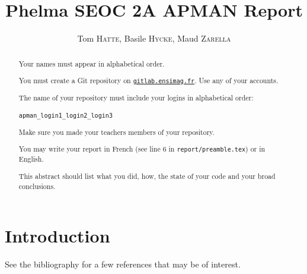 \documentclass[a4paper,notitlepage]{report}
\newcommand{\authorOne}   {Tom    \textsc{Hatte}}
\newcommand{\authorTwo}   {Basile \textsc{Hycke}}
\newcommand{\authorThree} {Maud   \textsc{Zarella}}
\begin{document}
\author{\authorOne, \authorTwo, \authorThree}
\title{Phelma {SEOC} 2A {APMAN} Report}

\hypersetup{pageanchor=false}
\begin{titlepage}
  \maketitle

  \begin{abstract}

    Your names must appear in alphabetical order.

    You must create a Git repository on \href{https://gitlab.ensimag.fr}{\texttt{gitlab.ensimag.fr}}. Use any of your accounts.

    The name of your repository must include your logins in alphabetical order:

    \hspace{3cm}\texttt{apman\_login1\_login2\_login3}

    Make sure you made your teachers members of your repository. 

    You may write your report in French (see line 6 in \texttt{report/preamble.tex}) or in English.

    This abstract should list what you did, how, the state of your code and your broad conclusions.
  \end{abstract}

\end{titlepage}
\hypersetup{pageanchor=true}

\tableofcontents

\listoffigures
{}


\nocite{*}

% 


% 

\chapter*{Introduction}

See the bibliography for a few references that may be of interest.
\end{document}
